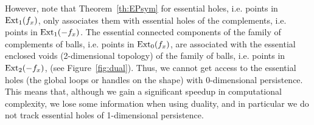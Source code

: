 However, note that Theorem~\ref{th:EPsym} for essential holes, i.e. points in $\mathrm{Ext}_1(f_x)$, only associates them with essential
holes of the complements, i.e. points in $\mathrm{Ext}_1(-f_x)$.  
The essential connected components of the family of complements of balls, i.e. points in $\mathrm{Ext}_0(f_x)$,
are associated with the essential enclosed voids (2-dimensional topology) of the family of balls, i.e. points in $\mathrm{Ext}_2(-f_x)$, (see Figure~\ref{fig:dual}).
Thus, we cannot get access to the essential holes (the global loops or handles
on the shape) with 0-dimensional persistence. This means that, although we gain a significant speedup in
computational complexity, we lose some information when using duality, and in particular we do
not track essential holes of 1-dimensional persistence.  

